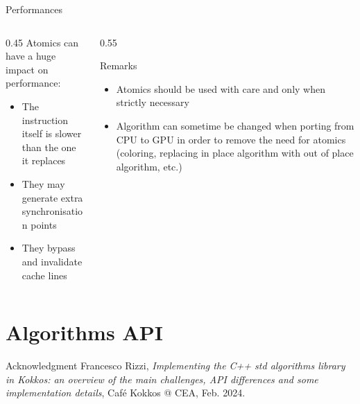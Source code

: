\documentclass[
    aspectratio=169,
]{beamer}
\begin{document}
\begin{frame}[fragile]{Performances}
    \begin{columns}
        \begin{column}{0.45\linewidth}
            Atomics can have a huge impact on performance:
            \begin{itemize}
                \item The instruction itself is slower than the one it replaces
                \item They may generate extra synchronisation points
                \item They bypass and invalidate cache lines
            \end{itemize}
        \end{column}
        \begin{column}{0.55\linewidth}
            \begin{block}{Remarks}
                \begin{itemize}
                    \item Atomics should be used with care and only when strictly
                    necessary
                    \item Algorithm can sometime be changed when porting from CPU to GPU
                    in order to remove the need for atomics (coloring, replacing in
                    place algorithm with out of place algorithm, etc.)
                \end{itemize}
            \end{block}
        \end{column}
    \end{columns}
\end{frame}

\section{Algorithms API}

\begin{frame}[fragile]{Acknowledgment}
    Francesco Rizzi, \emph{Implementing the C++ std algorithms library in
    Kokkos: an overview of the main challenges, API differences and
    some implementation details}, Café Kokkos @ CEA, Feb. 2024.
\end{frame}
\end{document}
